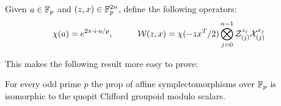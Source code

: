 \begin{definition}
Given $a \in \mathbb{F}_p$ and $(z,x )\in \mathbb{F}_p^{2n}$, define the following operators:
$$
\chi(a) = e^{2\pi\cdot i \cdot a/p}, \hspace*{1cm} {\mathcal W}(z,x)=\chi(-zx^T/2)\bigotimes_{j=0}^{n-1}\mathcal{Z}_{(j)}^{z_j}\mathcal{X}_{(j)}^{x_j}
$$

\end{definition}


This makes the following result more easy to prove:

\begin{lemma}
For every odd prime $p$ the prop  of affine symplectomorphisms over  $\mathbb{F}_p$ is isomorphic to the quopit Clifford groupoid modulo scalars.
\end{lemma}



